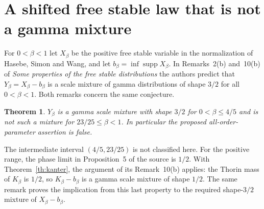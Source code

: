 \documentclass[11pt,a4paper]{article}
\newtheorem{theorem}{Theorem}[section]
\numberwithin{equation}{section}
\begin{document}
\section{A shifted free stable law that is not a gamma mixture}
\label{sec:shifted-stable}
For $0<\beta<1$ let $X_\beta$ be the positive free stable variable
in the normalization of Hasebe, Simon and Wang, and let
$b_\beta=\inf\operatorname{supp}X_\beta$.
In Remarks~2(b) and~10(b) of \emph{Some properties of the free stable
distributions} the authors predict that $Y_\beta=X_\beta-b_\beta$
is a scale mixture of gamma distributions of shape $3/2$ for all
$0<\beta<1$. Both remarks concern the same conjecture.
\begin{theorem}\label{th:shiftedstable}
$Y_\beta$ is a gamma scale mixture with shape $3/2$ for
$0<\beta\le4/5$ and is not such a mixture for $23/25\le\beta<1$.
In particular the proposed all-order-parameter assertion is false.
\end{theorem}
The intermediate interval $(4/5,23/25)$ is not classified here.
For the positive range, the phase limit in Proposition~5 of the
source is $1/2$. With Theorem~\ref{th:kanter}, the argument of its
Remark~10(b) applies: the Thorin mass of $K_\beta$ is $1/2$, so
$K_\beta-b_\beta$ is a gamma scale mixture of shape $1/2$.
The same remark proves the implication from this last property to the
required shape-$3/2$ mixture of $X_\beta-b_\beta$.
\end{document}

